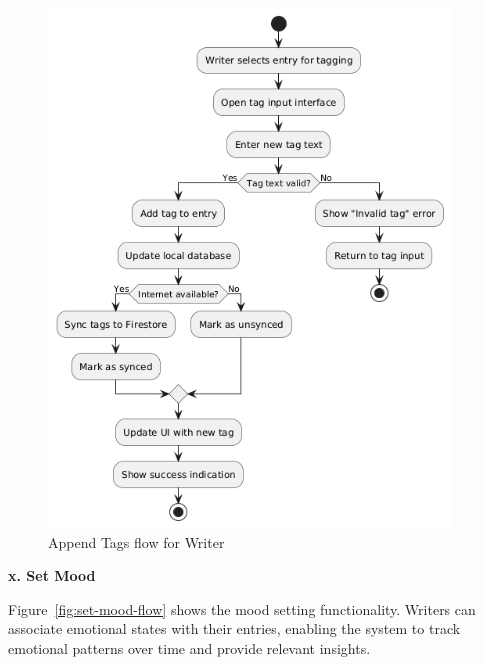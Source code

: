 \begin{figure}[H]
\centering
\includegraphics[width=0.95\textwidth,height=0.7\textheight,keepaspectratio]{files/imgs/append_tags_flow.png}
\caption{Append Tags flow for Writer}
\label{fig:append-tags-flow}
\end{figure}
\clearpage

\textbf{x. Set Mood}


Figure~\ref{fig:set-mood-flow} shows the mood setting functionality. Writers can associate emotional states with their entries, enabling the system to track emotional patterns over time and provide relevant insights.

